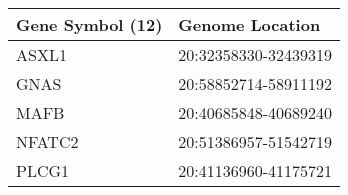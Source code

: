\begin{tabular}{ll}
\toprule
Gene Symbol (12) &      Genome Location \\
\midrule
           ASXL1 & 20:32358330-32439319 \\
            GNAS & 20:58852714-58911192 \\
            MAFB & 20:40685848-40689240 \\
          NFATC2 & 20:51386957-51542719 \\
           PLCG1 & 20:41136960-41175721 \\
\bottomrule
\end{tabular}
